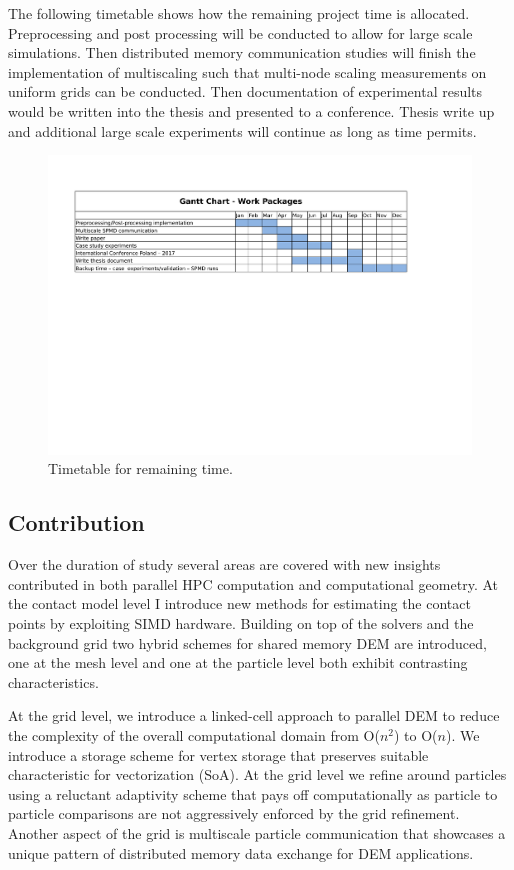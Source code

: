 \documentclass[times,12pt]{article}
\begin{document}
The following timetable shows how the remaining project time is allocated. Preprocessing and post processing will be conducted to allow for large scale simulations. Then distributed memory communication studies will finish the implementation of multiscaling such that multi-node scaling measurements on uniform grids can be conducted. Then documentation of experimental results would be written into the thesis and presented to a conference. Thesis write up and additional large scale experiments will continue as long as time permits.

\begin{figure}[!h]
\centering
\includegraphics[width=1\textwidth]{chart} \protect\caption{\label{nuclearcloseup}Timetable for remaining time.}
\end{figure}

\subsection{Contribution}

Over the duration of study several areas are covered with new insights contributed in both parallel HPC computation and computational geometry. At the contact model level I introduce new methods for estimating the contact points by exploiting SIMD hardware. Building on top of the solvers and the background grid two hybrid schemes for shared memory DEM are introduced, one at the mesh level and one at the particle level both exhibit contrasting characteristics.

At the grid level, we introduce a linked-cell approach to parallel DEM to reduce the complexity of the overall computational domain from O($n^2$) to O($n$). We introduce a storage scheme for vertex storage that preserves suitable characteristic for vectorization (SoA). At the grid level we refine around particles using a reluctant adaptivity scheme that pays off computationally as particle to particle comparisons are not aggressively enforced by the grid refinement. Another aspect of the grid is multiscale particle communication that showcases a unique pattern of distributed memory data exchange for DEM applications.
\end{document}
